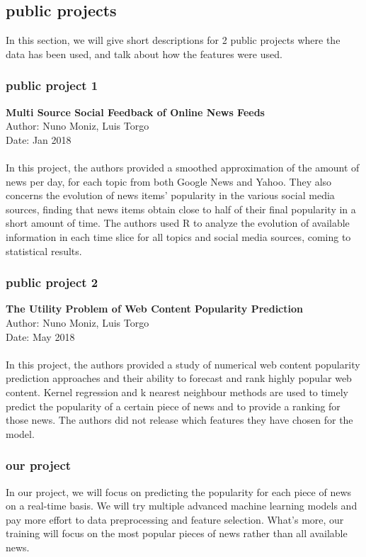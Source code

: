 \documentclass[10pt]{article}
\begin{document}
\subsection{public projects}
In this section, we will give short descriptions for 2 public projects where 
the data has been used, and talk about how the features were used.
\subsubsection{public project 1}
\textbf{Multi Source Social Feedback of Online News Feeds}\\
Author: Nuno Moniz, Luis Torgo\\
Date: Jan 2018\\
\\
In this project, the authors provided a smoothed approximation of the amount of 
news per day, for each topic from both Google News and Yahoo. They also 
concerns the evolution of news items’ popularity in the various social media sources, 
finding that news items obtain close to half of their final popularity in a 
short amount of time. The authors used R to analyze the evolution of available 
information in each time slice for all topics and social media sources, coming to 
statistical results.\\

\subsubsection{public project 2}
\textbf{The Utility Problem of Web Content Popularity Prediction}\\
Author: Nuno Moniz, Luis Torgo\\
Date: May 2018\\
\\
In this project, the authors provided a study of numerical web content popularity 
prediction approaches and their ability to forecast and rank highly popular web content.
Kernel regression and k nearest neighbour methods are used to timely predict the popularity 
of a certain piece of news and to provide a ranking for those news. The authors did not 
release which features they have chosen for the model.\\

\subsubsection{our project}
In our project, we will focus on predicting the popularity for each piece of news on a 
real-time basis. We will try multiple advanced machine learning models and pay more effort
to data preprocessing and feature selection. What's more, our training will focus on the most popular 
pieces of news rather than all available news. 
\end{document}
